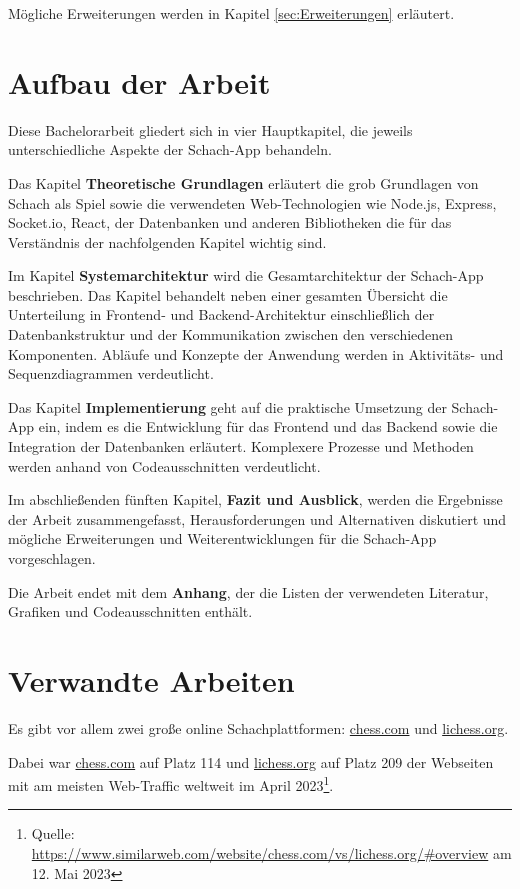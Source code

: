 Mögliche Erweiterungen werden in Kapitel \ref{sec:Erweiterungen} erläutert.
    
    \section{Aufbau der Arbeit}
Diese Bachelorarbeit gliedert sich in vier Hauptkapitel, die jeweils unterschiedliche Aspekte der Schach-App behandeln.

Das Kapitel \textbf{Theoretische Grundlagen} erläutert die grob Grundlagen von Schach als Spiel sowie die verwendeten Web-Technologien wie Node.js, Express, Socket.io, React, der Datenbanken und anderen Bibliotheken die für das Verständnis der nachfolgenden Kapitel wichtig sind.

Im Kapitel \textbf{Systemarchitektur} wird die Gesamtarchitektur der Schach-App beschrieben. Das Kapitel behandelt neben einer gesamten Übersicht die Unterteilung in Frontend- und Backend-Architektur einschließlich der Datenbankstruktur und der Kommunikation zwischen den verschiedenen Komponenten. Abläufe und Konzepte der Anwendung werden in Aktivitäts- und Sequenzdiagrammen verdeutlicht.

Das Kapitel \textbf{Implementierung} geht auf die praktische Umsetzung der Schach-App ein, indem es die Entwicklung für das Frontend und das Backend sowie die Integration der Datenbanken erläutert. Komplexere Prozesse und Methoden werden anhand von Codeausschnitten verdeutlicht.

Im abschließenden fünften Kapitel, \textbf{Fazit und Ausblick}, werden die Ergebnisse der Arbeit zusammengefasst, Herausforderungen und Alternativen diskutiert und mögliche Erweiterungen und Weiterentwicklungen für die Schach-App vorgeschlagen.

Die Arbeit endet mit dem \textbf{Anhang}, der die Listen der verwendeten Literatur, Grafiken und Codeausschnitten enthält.

\section{Verwandte Arbeiten}
\label{sec:Verwandte Arbeiten}
Es gibt vor allem zwei große online Schachplattformen: \url{chess.com} und \url{lichess.org}.

Dabei war \url{chess.com} auf Platz 114 und \url{lichess.org} auf Platz 209 der Webseiten mit am meisten Web-Traffic weltweit im April 2023\footnote{Quelle: \url{https://www.similarweb.com/website/chess.com/vs/lichess.org/\#overview} am 12. Mai 2023}.

